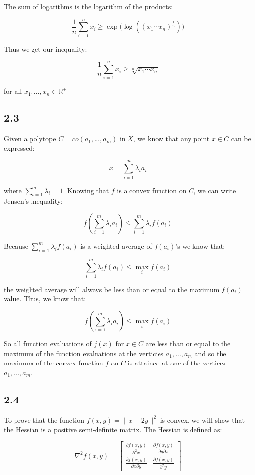 \documentclass[12pt]{article}
\begin{document}
The sum of logarithms is the logarithm of the products:

\[\frac{1}{n}\sum_{i=1}^n x_i \geq \exp \bigg(\log((x_1 \cdots x_n )^{\frac{1}{n}})\bigg)\]

Thus we get our inequality:

\[\frac{1}{n}\sum_{i=1}^n x_i \geq \sqrt[n]{x_1 \cdots x_n}\]

for all $x_1, ..., x_n \in \mathbb{R}^+$ \square

\subsection*{2.3}

Given a polytope $C=co(a_1, ..., a_m)$ in $X$, we know that any point $x \in C$ can be expressed:

\[x = \sum_{i=1}^{m} \lambda_i a_i \]

where $\sum_{i=1}^{m} \lambda_i = 1$. Knowing that $f$ is a convex function on $C$, we can write Jensen's inequality:

\[f\left(\sum_{i=1}^{m} \lambda_i a_i \right) \leq \sum_{i=1}^{m} \lambda_i f(a_i)\]

Because $\sum_{i=1}^{m} \lambda_i f(a_i)$ is a weighted average of $f(a_i)$'s we know that:

\[\sum_{i=1}^{m} \lambda_i f(a_i) \leq \max_{i} f(a_i)\]

the weighted average will always be less than or equal to the maximum $f(a_i)$ value. Thus, we know that:

\[f\left(\sum_{i=1}^{m} \lambda_i a_i \right) \leq \max_{i} f(a_i)\]

So all function evaluations of $f(x)$ for $x \in C$ are less than or equal to the maximum of the function evaluations at the verticies $a_1, ..., a_m$ and so the maximum of the convex function $f$ on $C$ is attained at one of the vertices $a_1, ..., a_m$.
\square

\subsection*{2.4}

To prove that the function $f(x, y) = \| x-2y\|^2$ is convex, we will show that the Hessian is a positive semi-definite matrix. The Hessian is defined as:


\[
\nabla^2 f(x, y) = \begin{bmatrix}
                 \frac{\partial f(x, y)}{\partial^2 x} & \frac{\partial f(x, y)}{\partial y \partial x}\\
                 \frac{\partial f(x, y)}{\partial x \partial y} & \frac{\partial f(x, y)}{\partial^2 y}
         \end{bmatrix}
\]
\end{document}
